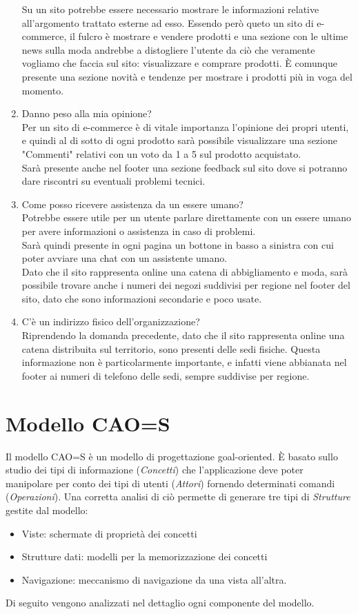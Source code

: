 \documentclass[12pt,a4paper]{report}
\begin{document}
\begin{enumerate}
  Su un sito potrebbe essere necessario mostrare le informazioni relative all'argomento trattato esterne ad esso. Essendo però queto un sito di e-commerce, il fulcro è mostrare e vendere prodotti e una sezione con le ultime news sulla moda andrebbe a distogliere l'utente da ciò che veramente vogliamo che faccia sul sito: visualizzare e comprare prodotti. È comunque presente una sezione novità e tendenze per mostrare i prodotti più in voga del momento.
  \item Danno peso alla mia opinione?\\
  Per un sito di e-commerce è di vitale importanza l'opinione dei propri utenti, e quindi al di sotto di ogni prodotto sarà possibile visualizzare una sezione "Commenti" relativi con un voto da 1 a 5 sul prodotto acquistato.\\
  Sarà presente anche nel footer una sezione feedback sul sito dove si potranno dare riscontri su eventuali problemi tecnici.
  \item Come posso ricevere assistenza da un essere umano?\\
  Potrebbe essere utile per un utente parlare direttamente con un essere umano per avere informazioni o assistenza in caso di problemi.\\
  Sarà quindi presente in ogni pagina un bottone in basso a sinistra con cui poter avviare una chat con un assistente umano.\\
  Dato che il sito rappresenta online una catena di abbigliamento e moda, sarà possibile trovare anche i numeri dei negozi suddivisi per regione nel footer del sito, dato che sono informazioni secondarie e poco usate.
  \item C'è un indirizzo fisico dell'organizzazione?\\
  Riprendendo la domanda precedente, dato che il sito rappresenta online una catena distribuita sul territorio, sono presenti delle sedi fisiche. Questa informazione non è particolarmente importante, e infatti viene abbianata nel footer ai numeri di telefono delle sedi, sempre suddivise per regione.
\end{enumerate}

\section{Modello CAO=S}
Il modello CAO=S è un modello di progettazione goal-oriented. È basato sullo studio dei tipi di informazione (\textit{Concetti}) che l'applicazione deve poter manipolare per conto dei tipi di utenti (\textit{Attori}) fornendo determinati comandi (\textit{Operazioni}). Una corretta analisi di ciò permette di generare tre tipi di \textit{Strutture} gestite dal modello:
\begin{itemize}
  \item Viste:  schermate di proprietà dei concetti
  \item Strutture dati: modelli per la memorizzazione dei concetti
  \item Navigazione:  meccanismo di navigazione da una vista all'altra.
\end{itemize}
Di seguito vengono analizzati nel dettaglio ogni componente del modello.
\end{document}
